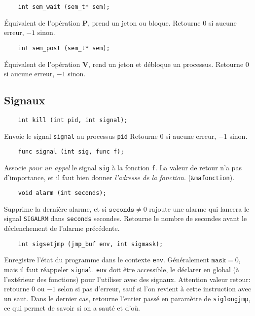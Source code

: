 \documentclass[10pt,twocolumn,a4paper]{article}
\begin{document}
\begin{lstlisting}
    int sem_wait (sem_t* sem);
\end{lstlisting}
\'Equivalent de l'opération \textbf{P}, prend un jeton ou bloque.
Retourne $0$ si aucune erreur, $-1$ sinon.


\begin{lstlisting}
    int sem_post (sem_t* sem);
\end{lstlisting}
\'Equivalent de l'opération \textbf{V}, rend un jeton et débloque un processus.
Retourne $0$ si aucune erreur, $-1$ sinon.

\subsection{Signaux}

\begin{lstlisting}
    int kill (int pid, int signal);
\end{lstlisting}
Envoie le signal \texttt{signal} au processus \texttt{pid}
Retourne $0$ si aucune erreur, $-1$ sinon.

\begin{lstlisting}
    func signal (int sig, func f);
\end{lstlisting}
Associe \emph{pour un appel} le signal \texttt{sig} à la fonction \texttt{f}.
La valeur de retour n'a pas d'importance, et il faut bien donner \emph{l'adresse de la fonction}.
(\texttt{\&mafonction}).

\begin{lstlisting}
    void alarm (int seconds);
\end{lstlisting}
Supprime la dernière alarme, et si $\texttt{seconds} \neq 0$ rajoute une alarme qui lancera le signal \texttt{SIGALRM} dans \texttt{seconds} secondes.
Retourne le nombre de secondes avant le déclenchement de l'alarme précédente.

\begin{lstlisting}
    int sigsetjmp (jmp_buf env, int sigmask);
\end{lstlisting}
Enregistre l'état du programme dans le contexte \texttt{env}. Généralement $\texttt{mask} = 0$, mais il faut réappeler \texttt{signal}.
\texttt{env} doit être accessible, le déclarer en global (à l'extérieur des fonctions) pour l'utiliser avec des signaux.
Attention valeur retour: retourne $0$ ou $-1$ selon si pas d'erreur, sauf si l'on revient à cette instruction avec un saut.
Dans le dernier cas, retourne l'entier passé en paramètre de \texttt{siglongjmp}, ce qui permet de savoir si on a sauté et d'où.
\end{document}
